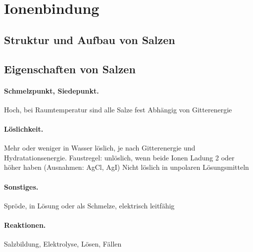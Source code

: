 \section{Ionenbindung}

\subsection{Struktur und Aufbau von Salzen}

\subsection{Eigenschaften von Salzen}

\paragraph{Schmelzpunkt, Siedepunkt.}

Hoch, bei Raumtemperatur sind alle Salze fest Abhängig von Gitterenergie

\paragraph{Löslichkeit.}

Mehr oder weniger in Wasser löslich, je nach Gitterenergie und Hydratationsenergie. Faustregel: unlöslich, wenn beide Ionen Ladung 2 oder höher haben (Ausnahmen: AgCl, AgI) Nicht löslich in unpolaren Lösungsmitteln

\paragraph{Sonstiges.}

Spröde, in Lösung oder als Schmelze, elektrisch leitfähig

\paragraph{Reaktionen.}

Salzbildung, Elektrolyse, Lösen, Fällen